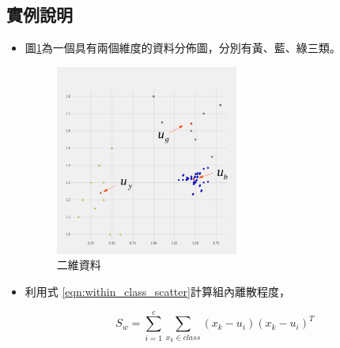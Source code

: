 \subsection{實例說明}
\begin{itemize}
	\item
	      圖\ref{fig:lda_demostrate}為一個具有兩個維度的資料分佈圖，分別有黃、藍、綠三類。
	      \begin{figure}[h]
		      \centering
		      \includegraphics[width=6cm]{./pic/gAKU29VT.png}
		      \caption{二維資料}
		      \label{fig:lda_demostrate}
	      \end{figure}


	\item
		利用式 \ref{eqn:within_class_scatter}計算組內離散程度，

		\begin{equation}
		      \label{eqn:within_class_scatter}
			S_w =\sum_{i=1}^{c} \sum^{}_{x_k\in class}  (x_k - u_i)(x_k-u_i)^T
		\end{equation}


\end{itemize}

